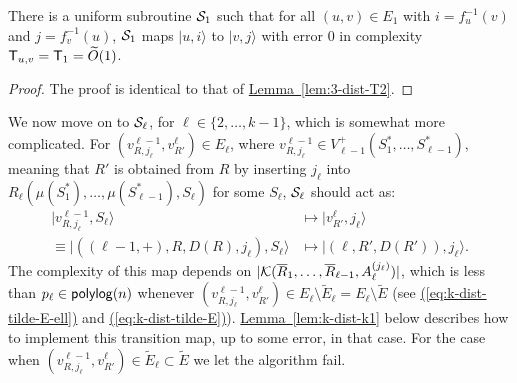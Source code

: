 \documentclass{article}
\newcommand{\eq}[1]{\hyperref[eq:#1]{(\ref*{eq:#1})}}
\newcommand{\lem}[1]{\hyperref[lem:#1]{Lemma~\ref*{lem:#1}}}
\def\ket#1{{\lvert}#1\rangle}
\renewcommand{\>}{\rangle}
\newcommand{\<}{\langle}
\renewcommand{\(}{\left(}
\renewcommand{\)}{\right)}
\begin{document}
\begin{lemma}\label{lem:k-dist-T2}
	There is a uniform subroutine ${\cal S}_1$ such that for all $(u,v)\in E_1$ with $i=f_u^{-1}(v)$ and $j=f_v^{-1}(u)$, ${\cal S}_1$ maps $\ket{u,i}$ to $\ket{v,j}$ with error 0 in complexity ${\sf T}_{u,v}={\sf T}_1=\widetilde{O}(1)$.
\end{lemma}
\begin{proof}
The proof is identical to that of \lem{3-dist-T2}.
\end{proof}

\noindent We now move on to ${\cal S}_{\ell}$, for $\ell \in \{2,\dots,k-1\}$, which is somewhat more complicated.
For $(v^{\ell-1}_{R,j_{\ell}},v^{\ell}_{R'})\in E_{\ell}$, where $v^{\ell-1}_{R,j_{\ell}}\in V_{\ell-1}^+(S_1^*,\dots,S_{\ell-1}^*)$, meaning that $R'$ is obtained from $R$ by inserting $j_{\ell}$ into $R_{\ell}(\mu(S_1^*),\dots,\mu(S_{\ell-1}^*),S_{\ell})$ for some $S_{\ell}$, ${\cal S}_{\ell}$ should act as:
\begin{equation}
\begin{split}
	\ket{v^{\ell-1}_{R,j_{\ell}},S_{\ell}} &\mapsto \ket{v^{\ell}_{R'},j_{\ell}}\\
\equiv \ket{(({\ell-1},+),R,D(R),j_{\ell}),S_{\ell}} &\mapsto \ket{(\ell,R',D(R')),j_{\ell}}.
	\end{split}\label{eq:kT3}
\end{equation}
The complexity of this map depends on $|{\cal K}(\overline{R}_1,\dots,\overline{R}_{\ell-1},A_{\ell}^{(j_{\ell})})|$, which is less than $p_{\ell}\in{\sf polylog}(n)$ whenever $(v^{\ell-1}_{R,j_{\ell}},v^{\ell}_{R'})\in E_{\ell}\setminus \tilde{E}_{\ell}=E_{\ell}\setminus\tilde{E}$ (see \eq{k-dist-tilde-E-ell} and \eq{k-dist-tilde-E}). \lem{k-dist-k1} below describes how to implement this transition map, up to some error, in that case. For the case when $(v^{\ell-1}_{R,j_{\ell}},v^{\ell}_{R'})\in \tilde{E}_{\ell}\subset \tilde{E}$ we let the algorithm fail.
\end{document}

